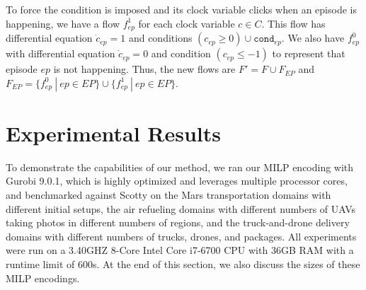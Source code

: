 \documentclass[sigconf]{acmart}
\begin{document}
To force the condition is imposed and its clock variable clicks when an episode is happening, we have a flow $f_{ep}^1$ for each clock variable $c \in C$. This flow has differential equation $\dot c_{ep} = 1$ and conditions $(c_{ep} \geq 0) \cup \texttt{cond}_{ep}$. We also have $f_{ep}^0$ with differential equation $\dot c_{ep} = 0$ and condition $(c_{ep} \leq -1)$ to represent that episode $ep$ is not happening. Thus, the new flows are $F' = F \cup F_{EP}$ and $F_{EP} =  \{ f_{ep}^0 \ | \ ep \in EP \} \cup \{ f_{ep}^1 \ | \ ep \in EP \}$.


\section{Experimental Results}\label{section:results}

To demonstrate the capabilities of our method, we ran our MILP encoding with Gurobi 9.0.1, which is highly optimized and leverages multiple processor cores, and benchmarked against Scotty \cite{fernandez2018scottyactivity} on the Mars transportation domains with different initial setups, the air refueling domains with different numbers of UAVs taking photos in different numbers of regions, and the truck-and-drone delivery domains with different numbers of trucks, drones, and packages. All experiments were run on a 3.40GHZ 8-Core Intel Core i7-6700 CPU with 36GB RAM with a runtime limit of $600$s. At the end of this section, we also discuss the sizes of these MILP encodings.
\end{document}

